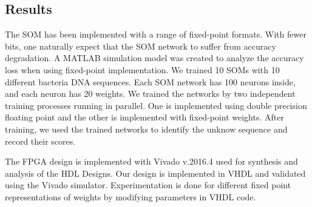 \documentclass[a4paper,10pt]{article}
\begin{document}
\subsection{Results}
The SOM has been implemented with a range of fixed-point formats. With fewer bits, one naturally expect that the SOM network to suffer from accuracy degradation. A MATLAB simulation model was created to analyze the accuracy loss when using fixed-point implementation. We trained 10 SOMs with 10 different bacteria DNA sequences. Each SOM network has 100 neurons inside, and each neuron has 20 weights. We trained the networks by two independent training processes running in parallel. One is implemented using double precision floating point and the other is implemented with fixed-point weights. After training, we used the trained networks to identify the unknow sequence and record their scores.

The FPGA design is implemented with Vivado v.2016.4 used for synthesis and analysis of the HDL Designs. Our design is implemented in VHDL and validated using the Vivado simulator. Experimentation is done for different fixed point representations of weights by modifying parameters in VHDL code. 
\end{document}
